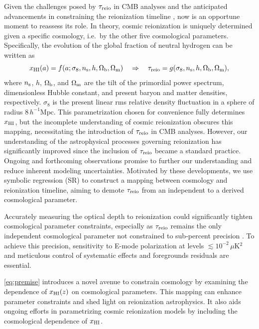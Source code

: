 Given the challenges posed by $\tau_{\mathrm{reio}}$ in CMB analyses and the
anticipated advancements in constraining the reionization timeline
\cite{Montero2021, Hera2022}, now is an opportune moment to reassess its
role.
In theory, cosmic reionization is uniquely determined given a specific
cosmology, i.e.\ by the other five cosmological parameters.
Specifically, the evolution of the global fraction of neutral hydrogen
can be written as
%
\begin{equation}
\label{eq:premise}
x_{\mathrm{HI}}(a) = f(a; \sigma_8, n_\mathrm{s}, h, \Omega_\mathrm{b}, \Omega_\mathrm{m})
\quad \Rightarrow \quad
\tau_{\mathrm{reio}} = g(\sigma_8, n_\mathrm{s}, h, \Omega_\mathrm{b}, \Omega_\mathrm{m}),
\end{equation}
%
where $n_\mathrm{s}$, $h$, $\Omega_\mathrm{b}$, and $\Omega_\mathrm{m}$ are the tilt of the
primordial power spectrum, dimensionless Hubble constant, and present
baryon and matter densities, respectively.
$\sigma_8$ is the present linear rms relative density fluctuation in a
sphere of radius $8 \, h^{-1}\mathrm{Mpc}$.
This parametrization chosen for convenience fully determines $x_{\mathrm{HI}}$,
but the incomplete understanding of cosmic reionization obscures this
mapping, necessitating the introduction of $\tau_{\mathrm{reio}}$ in CMB analyses.
However, our understanding of the astrophysical processes governing
reionization has significantly improved \cite{Gnedin2022, Kannan2022,
Murray2020, Fan2023} since the inclusion of $\tau_{\mathrm{reio}}$ became a
standard practice.
Ongoing and forthcoming observations promise to further our
understanding and reduce inherent modeling uncertainties.
Motivated by these developments, we use symbolic regression (SR)
\cite{Cranmer2023} to construct a mapping between cosmology and
reionization timeline, aiming to demote $\tau_{\mathrm{reio}}$ from an independent
to a derived cosmological parameter.

Accurately measuring the optical depth to reionization could
significantly tighten cosmological parameter constraints, especially as
$\tau_{\mathrm{reio}}$ remains the only independent cosmological parameter not
constrained to sub-percent precision \cite{Planck2020b}.
To achieve this precision, sensitivity to E-mode polarization at levels
$\lesssim 10^{-2} \, \mu$K$^2$ and meticulous control of systematic
effects and foregrounds residuals are essential.

\cref{eq:premise} introduces a novel avenue to constrain cosmology
by examining the dependence of $x_{\mathrm{HI}}(z)$ on cosmological parameters.
This mapping can enhance parameter constraints and shed light on
reionization astrophysics.
It also aids ongoing efforts in parametrizing cosmic reionization models
\cite{Trac2018, Trac2022} by including the cosmological dependence of
$x_{\mathrm{HI}}$.


